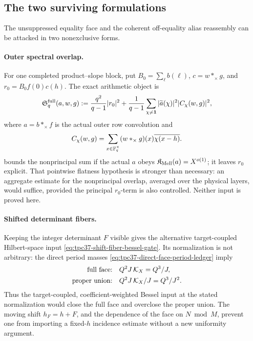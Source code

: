 \subsection{The two surviving formulations}

The unsuppressed equality face and the coherent off-equality alias
reassembly can be attacked in two nonexclusive forms.

\paragraph{Outer spectral overlap.}
For one completed product--slope block, put
\(B_0=\sum_\ell b(\ell)\), \(c=w*_\times g\), and
\(r_0=B_0f(0)c(h)\).  The exact arithmetic object is
\begin{equation}
 \mathfrak S_q^{\rm full}(a,w,g)
 :=\frac{q^2}{q-1}|r_0|^2
 +\frac1{q-1}\sum_{\chi\ne\mathbf1}
 |\widetilde a(\chi)|^2|C_\chi(w,g)|^2,
 \label{eq:tpc37-outer-overlap-gate}
\end{equation}
where \(a=b*_{\times}f\) is the actual outer row convolution and
\[
 C_\chi(w,g)=
 \sum_{x\in\mathbb F_q^\times}(w*_{\times}g)(x)
 \overline{\chi(x-h)}.
\]
 bounds the nonprincipal sum
if the actual \(a\) obeys
\(\mathfrak K_{\rm Mell}(a)=X^{o(1)}\); it leaves \(r_0\) explicit.
That pointwise flatness hypothesis is stronger than necessary: an
aggregate estimate for the nonprincipal overlap, averaged over the
physical layers, would suffice, provided the principal \(r_0\)-term is
also controlled.  Neither input is proved here.

\paragraph{Shifted determinant fibers.}
Keeping the integer determinant \(F\) visible gives the alternative
target-coupled Hilbert-space input
\eqref{eq:tpc37-shift-fiber-bessel-gate}.  Its normalization is not
arbitrary: the direct period masses
\eqref{eq:tpc37-direct-face-period-ledger} imply
\begin{align}
 \text{full face:}\quad &Q^2J\,\mathcal K_X=Q^3/J,
 \notag\\
 \text{proper union:}\quad
 &Q^2J\,\mathcal K_X/J=Q^3/J^2.
 \label{eq:tpc37-two-fiber-ledgers}
\end{align}
Thus the target-coupled, coefficient-weighted Bessel input at the stated
normalization would close the full face and overclose the proper union.
The moving shift \(h_F=h+F\), and the dependence of the face on
\(N\bmod M\), prevent one from importing a fixed-\(h\) incidence estimate
without a new uniformity argument.

